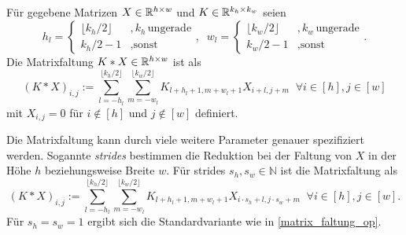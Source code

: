 \begin{defi} \label{matrix_faltung}
    Für gegebene Matrizen $X \in \mathbb{R}^{h \times w}$ und $K \in \mathbb{R}^{k_h \times k_w}$ seien 
    \begin{equation*}
        h_l=\begin{cases}
           \lfloor k_h/2  \rfloor &, k_h \, \text{ungerade} \\
           k_h/2-1 &, \text{sonst}
        \end{cases}, \; \; 
        w_l=\begin{cases}
            \lfloor k_w/2 \rfloor &, k_w \, \text{ungerade} \\
            k_w/2 -1 &, \text{sonst}    
        \end{cases}.
    \end{equation*} 
    Die Matrixfaltung $K \ast X \in \mathbb{R}^{h \times w}$ ist als 
    \begin{equation}
        \label{matrix_faltung_op}
        (K \ast X)_{i,j}:=\sum_{l=-h_l}^{\lfloor k_h/2  \rfloor} \sum_{m=-w_l}^{\lfloor k_w/2 \rfloor} K_{l+h_l+1, m+w_l+1} X_{i+l,j+m} \; \; \forall i \in [h], j \in [w]
    \end{equation} mit $X_{i,j}=0$ für $i \notin [h]$ und $j \notin [w]$ definiert.
    \end{defi}

\begin{bem}\label{bem_strides}
    Die Matrixfaltung kann durch viele weitere Parameter genauer spezifiziert werden. Sogannte \textit{strides} bestimmen die Reduktion bei der Faltung von $X$ in der Höhe $h$ beziehungsweise Breite $w$. Für strides $s_h, s_w \in \mathbb{N}$ ist die Matrixfaltung als
    \begin{equation*}
        (K \ast X)_{i,j}:=\sum_{l=-h_l}^{\lfloor k_h/2  \rfloor} \sum_{m=-w_l}^{\lfloor k_w/2 \rfloor} K_{l+h_l+1, m+w_l+1} X_{i \cdot s_h +l,j \cdot s_w +m} \; \; \forall i \in [h], j \in [w].
    \end{equation*}
    Für $s_h=s_w=1$ ergibt sich die Standardvariante wie in \ref{matrix_faltung_op}.
    \end{bem}

